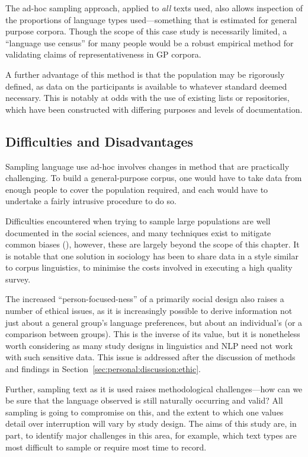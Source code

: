 The ad-hoc sampling approach, applied to \textsl{all} texts used, also allows inspection of the proportions of language types used---something that is estimated for general purpose corpora.  Though the scope of this case study is necessarily limited, a ``language use census'' for many people would be a robust empirical method for validating claims of representativeness in GP corpora.


A further advantage of this method is that the population may be rigorously defined, as data on the participants is available to whatever standard deemed necessary.  This is notably at odds with the use of existing lists or repositories, which have been constructed with differing purposes and levels of documentation.






\subsection{Difficulties and Disadvantages}
Sampling language use ad-hoc involves changes in method that are practically challenging.  To build a general-purpose corpus, one would have to take data from enough people to cover the population required, and each would have to undertake a fairly intrusive procedure to do so.

Difficulties encountered when trying to sample large populations are well documented in the social sciences, and many techniques exist to mitigate common biases (), however, these are largely beyond the scope of this chapter.  It is notable that one solution in sociology has been to share data in a style similar to corpus linguistics, to minimise the costs involved in executing a high quality survey.

The increased ``person-focused-ness'' of a primarily social design also raises a number of ethical issues, as it is increasingly possible to derive information not just about a general group's language preferences, but about an individual's (or a comparison between groups).  This is the inverse of its value, but it is nonetheless worth considering as many study designs in linguistics and NLP need not work with such sensitive data.  This issue is addressed after the discussion of methods and findings in Section~\ref{sec:personal:discussion:ethic}.

Further, sampling text as it is used raises methodological challenges---how can we be sure that the language observed is still naturally occurring and valid?  All sampling is going to compromise on this, and the extent to which one values detail over interruption will vary by study design.  The aims of this study are, in part, to identify major challenges in this area, for example, which text types are most difficult to sample or require most time to record.














